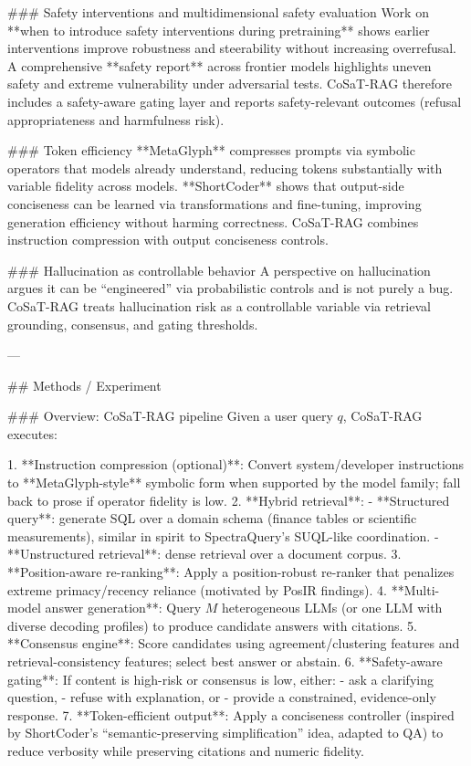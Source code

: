### Safety interventions and multidimensional safety evaluation  
Work on **when to introduce safety interventions during pretraining** shows earlier interventions improve robustness and steerability without increasing overrefusal. A comprehensive **safety report** across frontier models highlights uneven safety and extreme vulnerability under adversarial tests. CoSaT-RAG therefore includes a safety-aware gating layer and reports safety-relevant outcomes (refusal appropriateness and harmfulness risk).

### Token efficiency  
**MetaGlyph** compresses prompts via symbolic operators that models already understand, reducing tokens substantially with variable fidelity across models. **ShortCoder** shows that output-side conciseness can be learned via transformations and fine-tuning, improving generation efficiency without harming correctness. CoSaT-RAG combines instruction compression with output conciseness controls.

### Hallucination as controllable behavior  
A perspective on hallucination argues it can be “engineered” via probabilistic controls and is not purely a bug. CoSaT-RAG treats hallucination risk as a controllable variable via retrieval grounding, consensus, and gating thresholds.

---

## Methods / Experiment  

### Overview: CoSaT-RAG pipeline  
Given a user query \(q\), CoSaT-RAG executes:

1. **Instruction compression (optional)**: Convert system/developer instructions to **MetaGlyph-style** symbolic form when supported by the model family; fall back to prose if operator fidelity is low.  
2. **Hybrid retrieval**:  
   - **Structured query**: generate SQL over a domain schema (finance tables or scientific measurements), similar in spirit to SpectraQuery’s SUQL-like coordination.  
   - **Unstructured retrieval**: dense retrieval over a document corpus.  
3. **Position-aware re-ranking**: Apply a position-robust re-ranker that penalizes extreme primacy/recency reliance (motivated by PosIR findings).  
4. **Multi-model answer generation**: Query \(M\) heterogeneous LLMs (or one LLM with diverse decoding profiles) to produce candidate answers with citations.  
5. **Consensus engine**: Score candidates using agreement/clustering features and retrieval-consistency features; select best answer or abstain.  
6. **Safety-aware gating**: If content is high-risk or consensus is low, either:  
   - ask a clarifying question,  
   - refuse with explanation, or  
   - provide a constrained, evidence-only response.  
7. **Token-efficient output**: Apply a conciseness controller (inspired by ShortCoder’s “semantic-preserving simplification” idea, adapted to QA) to reduce verbosity while preserving citations and numeric fidelity.

